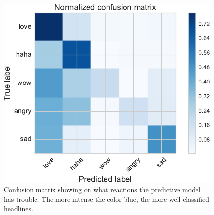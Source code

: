 \documentclass[9pt]{article}
\begin{document}
\begin{figure}[ht!]
\centering
\includegraphics[width=0.9\columnwidth]{../3_notebooks/notebook_figures/conf.pdf}
\caption{Confusion matrix showing on what reactions the predictive model has trouble. The more intense the color blue, the more well-classified headlines.}
\label{fig:conf}
\end{figure}
\end{document}
